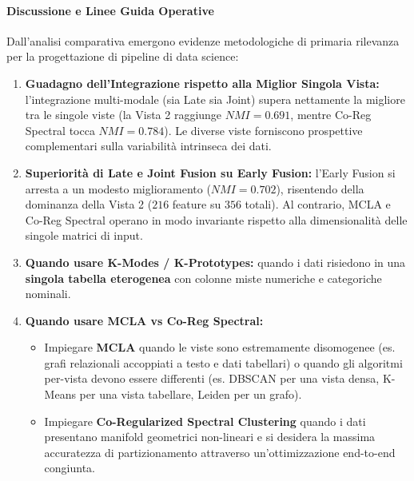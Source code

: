 \paragraph{Discussione e Linee Guida Operative}
Dall'analisi comparativa emergono evidenze metodologiche di primaria rilevanza per la progettazione di pipeline di data science:
\begin{enumerate}
    \item \textbf{Guadagno dell'Integrazione rispetto alla Miglior Singola Vista:} l'integrazione multi-modale (sia Late sia Joint) supera nettamente la migliore tra le singole viste (la Vista 2 raggiunge $NMI=0.691$, mentre Co-Reg Spectral tocca $NMI=0.784$). Le diverse viste forniscono prospettive complementari sulla variabilità intrinseca dei dati.
    \item \textbf{Superiorità di Late e Joint Fusion su Early Fusion:} l'Early Fusion si arresta a un modesto miglioramento ($NMI=0.702$), risentendo della dominanza della Vista 2 ($216$ feature su $356$ totali). Al contrario, MCLA e Co-Reg Spectral operano in modo invariante rispetto alla dimensionalità delle singole matrici di input.
    \item \textbf{Quando usare K-Modes / K-Prototypes:} quando i dati risiedono in una \textbf{singola tabella eterogenea} con colonne miste numeriche e categoriche nominali.
    \item \textbf{Quando usare MCLA vs Co-Reg Spectral:}
    \begin{itemize}
        \item Impiegare \textbf{MCLA} quando le viste sono estremamente disomogenee (es. grafi relazionali accoppiati a testo e dati tabellari) o quando gli algoritmi per-vista devono essere differenti (es. DBSCAN per una vista densa, K-Means per una vista tabellare, Leiden per un grafo).
        \item Impiegare \textbf{Co-Regularized Spectral Clustering} quando i dati presentano manifold geometrici non-lineari e si desidera la massima accuratezza di partizionamento attraverso un'ottimizzazione end-to-end congiunta.
    \end{itemize}
\end{enumerate}
